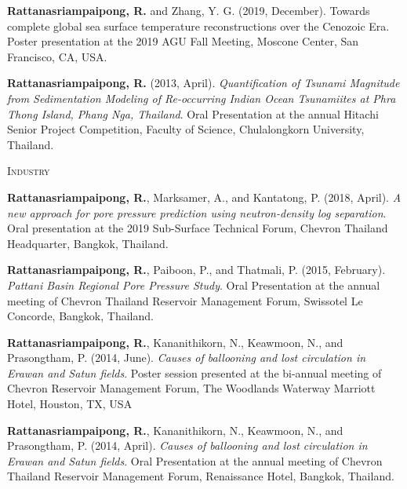 \documentclass[10pt, letter]{article}
\newcommand{\myname}[1]{\textbf{Rattanasriampaipong, R.}}
\begin{document}
\begin{etaremune}
\item {\myname{rattanasriampaipong}} and Zhang, Y. G. (2019, December). Towards complete global sea surface temperature reconstructions over the Cenozoic Era. Poster presentation at the 2019 AGU Fall Meeting, Moscone Center, San Francisco, CA, USA.

\item {\myname{rattanasriampaipong}} (2013, April). \textit{Quantification of Tsunami Magnitude from Sedimentation Modeling of Re-occurring Indian Ocean Tsunamiites at Phra Thong Island, Phang Nga, Thailand}. Oral Presentation at the annual Hitachi Senior Project Competition, Faculty of Science, Chulalongkorn University, Thailand.
\end{etaremune}

\bigskip
\textsc{Industry}
\begin{etaremune}
\item {\myname{rattanasriampaipong}},  Marksamer, A., and Kantatong, P. (2018, April). \textit{A new approach for pore pressure prediction using neutron-density log separation}. Oral presentation at the 2019 Sub-Surface Technical Forum, Chevron Thailand Headquarter, Bangkok, Thailand.

\item {\myname{rattanasriampaipong}}, Paiboon, P., and Thatmali, P. (2015, February). \textit{Pattani Basin Regional Pore Pressure Study}. Oral Presentation at the annual meeting of Chevron Thailand Reservoir Management Forum, Swissotel Le Concorde, Bangkok, Thailand.

\item {\myname{rattanasriampaipong}}, Kananithikorn, N., Keawmoon, N., and Prasongtham, P. (2014, June). \textit{Causes of ballooning and lost circulation in Erawan and Satun fields}. Poster session presented at the bi-annual meeting of Chevron Reservoir Management Forum, The Woodlands Waterway Marriott Hotel, Houston, TX, USA
\item {\myname{rattanasriampaipong}}, Kananithikorn, N., Keawmoon, N., and Prasongtham, P. (2014, April). 
\textit{Causes of ballooning and lost circulation in Erawan and Satun fields}. Oral Presentation at the annual meeting of Chevron Thailand Reservoir Management Forum, Renaissance Hotel, Bangkok, Thailand.

\end{etaremune}
\end{document}
